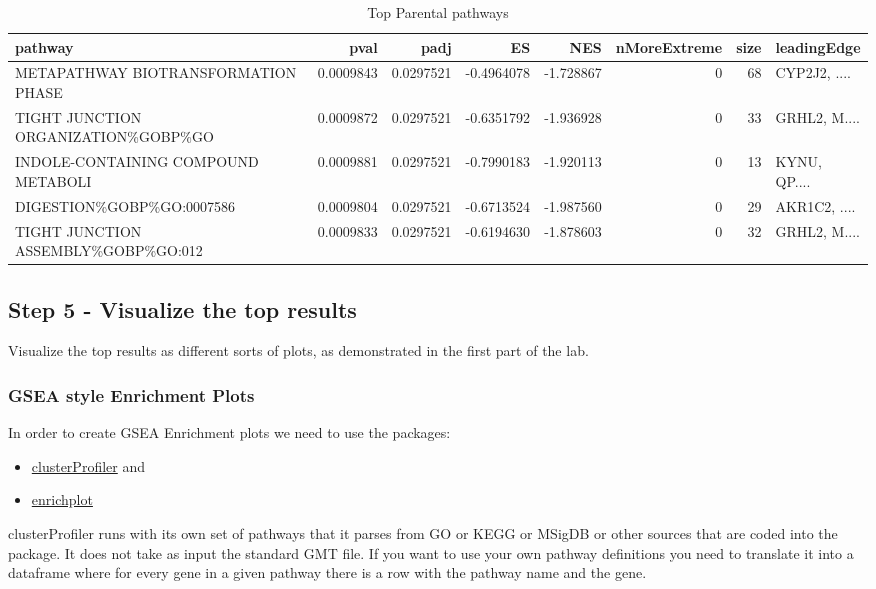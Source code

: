 \documentclass[
]{book}
\providecommand{\tightlist}{%
  \setlength{\itemsep}{0pt}\setlength{\parskip}{0pt}}
\begin{document}
\begin{table}
\centering
\caption{\label{tab:top-pathways-down}Top Parental pathways}
\centering
\fontsize{10}{12}\selectfont
\begin{tabular}[t]{l|r|r|r|r|r|r|l}
\hline
pathway & pval & padj & ES & NES & nMoreExtreme & size & leadingEdge\\
\hline
METAPATHWAY BIOTRANSFORMATION PHASE & 0.0009843 & 0.0297521 & -0.4964078 & -1.728867 & 0 & 68 & CYP2J2, ....\\
\hline
TIGHT JUNCTION ORGANIZATION\%GOBP\%GO & 0.0009872 & 0.0297521 & -0.6351792 & -1.936928 & 0 & 33 & GRHL2, M....\\
\hline
INDOLE-CONTAINING COMPOUND METABOLI & 0.0009881 & 0.0297521 & -0.7990183 & -1.920113 & 0 & 13 & KYNU, QP....\\
\hline
DIGESTION\%GOBP\%GO:0007586 & 0.0009804 & 0.0297521 & -0.6713524 & -1.987560 & 0 & 29 & AKR1C2, ....\\
\hline
TIGHT JUNCTION ASSEMBLY\%GOBP\%GO:012 & 0.0009833 & 0.0297521 & -0.6194630 & -1.878603 & 0 & 32 & GRHL2, M....\\
\hline
\end{tabular}
\end{table}

\subsection{Step 5 - Visualize the top results}\label{step-5---visualize-the-top-results}

Visualize the top results as different sorts of plots, as demonstrated in the first part of the lab.

\subsubsection{GSEA style Enrichment Plots}\label{gsea-style-enrichment-plots}

In order to create GSEA Enrichment plots we need to use the packages:

\begin{itemize}
\tightlist
\item
  \href{https://bioconductor.org/packages/release/bioc/html/clusterProfiler.html}{clusterProfiler} and
\item
  \href{https://bioconductor.org/packages/release/bioc/html/enrichplot.html}{enrichplot}
\end{itemize}

clusterProfiler runs with its own set of pathways that it parses from GO or KEGG or MSigDB or other sources that are coded into the package. It does not take as input the standard GMT file. If you want to use your own pathway definitions you need to translate it into a dataframe where for every gene in a given pathway there is a row with the pathway name and the gene.
\end{document}
